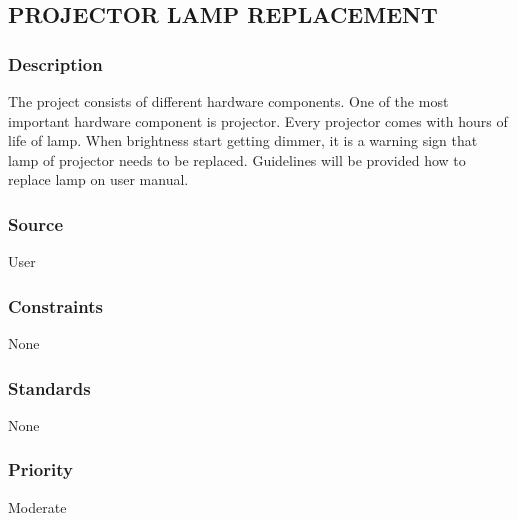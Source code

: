 \subsection{PROJECTOR LAMP REPLACEMENT}
\subsubsection{Description}
The project consists of different hardware components. One of the most important hardware component is projector. Every projector comes with hours of life of lamp. When brightness start getting dimmer, it is a warning sign that lamp of projector needs to be replaced. Guidelines will be provided how to replace lamp on user manual. 
\subsubsection{Source}
User
\subsubsection{Constraints}
None
\subsubsection{Standards}
None
\subsubsection{Priority}
Moderate

